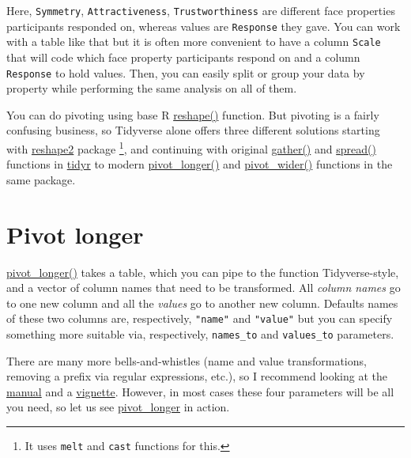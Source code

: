\documentclass[
]{book}
\begin{document}
Here, \texttt{Symmetry}, \texttt{Attractiveness}, \texttt{Trustworthiness} are different face properties participants responded on, whereas values are \texttt{Response} they gave. You can work with a table like that but it is often more convenient to have a column \texttt{Scale} that will code which face property participants respond on and a column \texttt{Response} to hold values. Then, you can easily split or group your data by property while performing the same analysis on all of them.

You can do pivoting using base R \href{https://stat.ethz.ch/R-manual/R-patched/library/stats/html/reshape.html}{reshape()} function. But pivoting is a fairly confusing business, so Tidyverse alone offers three different solutions starting with \href{https://cran.r-project.org/package=reshape2}{reshape2} package \footnote{It uses \texttt{melt} and \texttt{cast} functions for this.}, and continuing with original \href{https://tidyr.tidyverse.org/reference/gather.html}{gather()} and \href{https://tidyr.tidyverse.org/reference/spread.html}{spread()}
functions in \href{https://tidyr.tidyverse.org/index.html}{tidyr} to modern \href{https://tidyr.tidyverse.org/reference/pivot_longer.html}{pivot\_longer()} and \href{https://tidyr.tidyverse.org/reference/pivot_wider.html}{pivot\_wider()} functions in the same package.

\hypertarget{pivot-longer}{%
\section{Pivot longer}\label{pivot-longer}}

\href{https://tidyr.tidyverse.org/reference/pivot_longer.html}{pivot\_longer()} takes a table, which you can pipe to the function Tidyverse-style, and a vector of column names that need to be transformed. All \emph{column names} go to one new column and all the \emph{values} go to another new column. Defaults names of these two columns are, respectively, \texttt{"name"} and \texttt{"value"} but you can specify something more suitable via, respectively, \texttt{names\_to} and \texttt{values\_to} parameters.

There are many more bells-and-whistles (name and value transformations, removing a prefix via regular expressions, etc.), so I recommend looking at the \href{https://tidyr.tidyverse.org/reference/pivot_longer.html}{manual} and a \href{https://tidyr.tidyverse.org/articles/pivot.html}{vignette}. However, in most cases these four parameters will be all you need, so let us see \href{https://tidyr.tidyverse.org/reference/pivot_longer.html}{pivot\_longer} in action.
\end{document}
